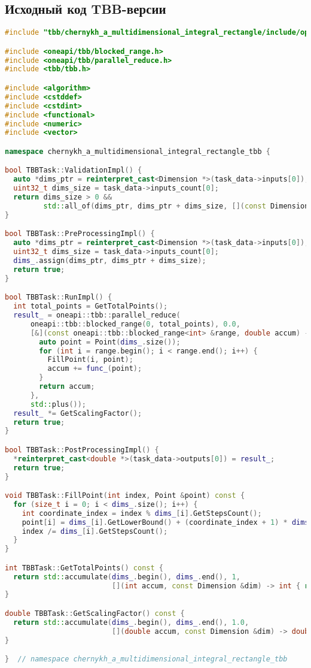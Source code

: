 \documentclass[a4paper,12pt]{article}
\begin{document}
  \subsection{Исходный код TBB-версии}\label{subsec:tbb}

  \begin{lstlisting}[language=C++,label={lst:tbb}]
#include "tbb/chernykh_a_multidimensional_integral_rectangle/include/ops_tbb.hpp"

#include <oneapi/tbb/blocked_range.h>
#include <oneapi/tbb/parallel_reduce.h>
#include <tbb/tbb.h>

#include <algorithm>
#include <cstddef>
#include <cstdint>
#include <functional>
#include <numeric>
#include <vector>

namespace chernykh_a_multidimensional_integral_rectangle_tbb {

bool TBBTask::ValidationImpl() {
  auto *dims_ptr = reinterpret_cast<Dimension *>(task_data->inputs[0]);
  uint32_t dims_size = task_data->inputs_count[0];
  return dims_size > 0 &&
         std::all_of(dims_ptr, dims_ptr + dims_size, [](const Dimension &dim) -> bool { return dim.IsValid(); });
}

bool TBBTask::PreProcessingImpl() {
  auto *dims_ptr = reinterpret_cast<Dimension *>(task_data->inputs[0]);
  uint32_t dims_size = task_data->inputs_count[0];
  dims_.assign(dims_ptr, dims_ptr + dims_size);
  return true;
}

bool TBBTask::RunImpl() {
  int total_points = GetTotalPoints();
  result_ = oneapi::tbb::parallel_reduce(
      oneapi::tbb::blocked_range(0, total_points), 0.0,
      [&](const oneapi::tbb::blocked_range<int> &range, double accum) -> double {
        auto point = Point(dims_.size());
        for (int i = range.begin(); i < range.end(); i++) {
          FillPoint(i, point);
          accum += func_(point);
        }
        return accum;
      },
      std::plus());
  result_ *= GetScalingFactor();
  return true;
}

bool TBBTask::PostProcessingImpl() {
  *reinterpret_cast<double *>(task_data->outputs[0]) = result_;
  return true;
}

void TBBTask::FillPoint(int index, Point &point) const {
  for (size_t i = 0; i < dims_.size(); i++) {
    int coordinate_index = index % dims_[i].GetStepsCount();
    point[i] = dims_[i].GetLowerBound() + (coordinate_index + 1) * dims_[i].GetStepSize();
    index /= dims_[i].GetStepsCount();
  }
}

int TBBTask::GetTotalPoints() const {
  return std::accumulate(dims_.begin(), dims_.end(), 1,
                         [](int accum, const Dimension &dim) -> int { return accum * dim.GetStepsCount(); });
}

double TBBTask::GetScalingFactor() const {
  return std::accumulate(dims_.begin(), dims_.end(), 1.0,
                         [](double accum, const Dimension &dim) -> double { return accum * dim.GetStepSize(); });
}

}  // namespace chernykh_a_multidimensional_integral_rectangle_tbb
  \end{lstlisting}
\end{document}
